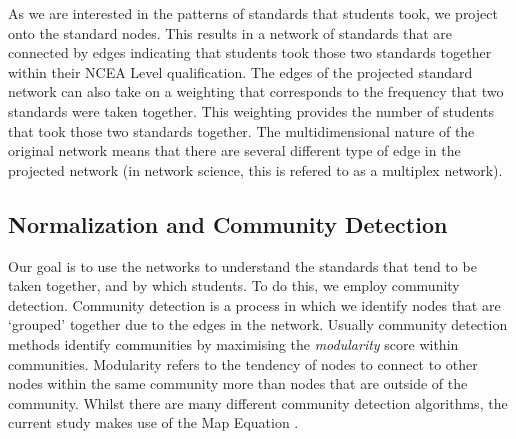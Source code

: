 As we are interested in the patterns of standards that students took, we project onto the standard nodes. This results in a network of standards that are connected by edges indicating that students took those two standards together within their NCEA Level qualification. The edges of the projected standard network can also take on a weighting that corresponds to the frequency that two standards were taken together. This weighting provides the number of students that took those two standards together. The multidimensional nature of the original network means that there are several different type of edge in the projected network (in network science, this is refered to as a multiplex network). 

\subsection{Normalization and Community Detection}
Our goal is to use the networks to understand the standards that tend to be taken together, and by which students. To do this, we employ community detection. Community detection is a process in which we identify nodes that are `grouped' together due to the edges in the network. Usually community detection methods identify communities by maximising the \textit{modularity} score within communities. Modularity refers to the tendency of nodes to connect to other nodes within the same community more than nodes that are outside of the community. Whilst there are many different community detection algorithms, the current study makes use of the Map Equation \citep{rosvall2009map}. 

